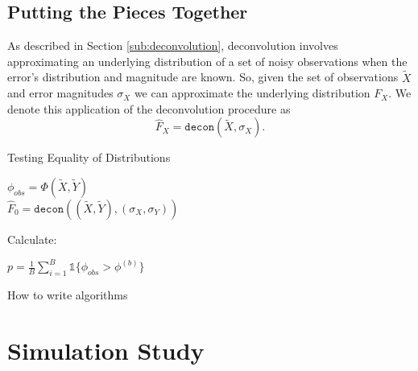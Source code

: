 \documentclass[12pt]{article}
\begin{document}
\subsection{Putting the Pieces Together} %
\label{sub:putting_the_pieces_together}

As described in Section \ref{sub:deconvolution}, deconvolution involves approximating an underlying distribution of a set of noisy observations when the error's distribution and magnitude are known. So, given the set of observations $\widetilde{X}$ and error magnitudes $\sigma_X$ we can approximate the underlying distribution $F_X$. We denote this application of the deconvolution procedure as
\begin{equation}
\widehat{F}_X = \texttt{decon}(\widetilde{X}, \sigma_X).
\end{equation}



\begin{algorithm}[H]
\caption{Testing Equality of Distributions}
\label{deconv_boot_test}


 $\phi_{obs} = \Phi(\widetilde{X}, \widetilde{Y})$\\
 $\widehat{F}_0 = \texttt{decon}((\widetilde{X}, \widetilde{Y}), (\sigma_X, \sigma_Y))$

 Calculate:

 $p = \frac{1}{B}\sum_{i = 1}^B {{\mathds{1}}\{\phi_{obs} > \phi^{(b)}\}}$
 \caption{How to write algorithms}
\end{algorithm}







\section{Simulation Study} %
\label{sec:simulation_study}





\end{document}
